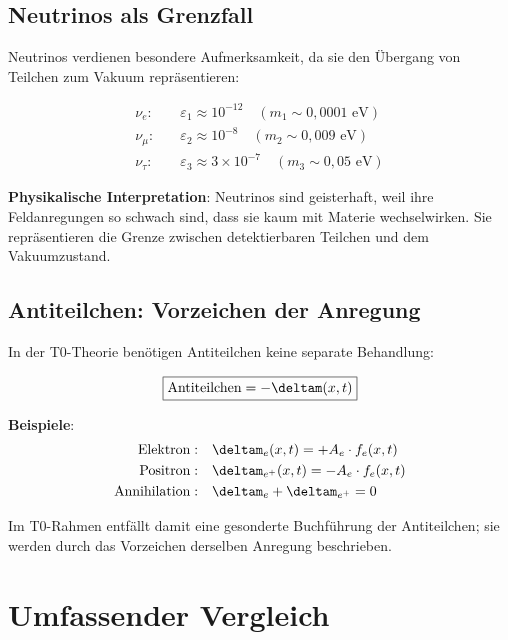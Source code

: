 	\subsection{Neutrinos als Grenzfall}
	
	Neutrinos verdienen besondere Aufmerksamkeit, da sie den Übergang von Teilchen zum Vakuum repräsentieren:
	
	\begin{equation}
		\begin{aligned}
			\nu_e: \quad &\varepsilon_1 \approx 10^{-12} \quad (m_1 \sim 0{,}0001 \text{ eV}) \\
			\nu_\mu: \quad &\varepsilon_2 \approx 10^{-8} \quad (m_2 \sim 0{,}009 \text{ eV}) \\
			\nu_\tau: \quad &\varepsilon_3 \approx 3 \times 10^{-7} \quad (m_3 \sim 0{,}05 \text{ eV})
		\end{aligned}
		\label{eq:neutrino_spectrum}
	\end{equation}
	
	\textbf{Physikalische Interpretation}: Neutrinos sind geisterhaft, weil ihre Feldanregungen so schwach sind, dass sie kaum mit Materie wechselwirken. Sie repräsentieren die Grenze zwischen detektierbaren Teilchen und dem Vakuumzustand.
	
	\subsection{Antiteilchen: Vorzeichen der Anregung}
	
	In der T0-Theorie benötigen Antiteilchen keine separate Behandlung:
	
	\begin{equation}
		\boxed{\text{Antiteilchen} = -\deltam(x,t)}
		\label{eq:antiparticle_unification}
	\end{equation}
	
	\textbf{Beispiele}:
	\begin{align}
		\text{Elektron}: \quad &\deltam_e(x,t) = +A_e \cdot f_e(x,t) \\
		\text{Positron}: \quad &\deltam_{e^+}(x,t) = -A_e \cdot f_e(x,t) \\
		\text{Annihilation}: \quad &\deltam_e + \deltam_{e^+} = 0
	\end{align}
	
	Im T0-Rahmen entfällt damit eine gesonderte Buchführung der Antiteilchen; sie werden durch das Vorzeichen derselben Anregung beschrieben.
	
	\section{Umfassender Vergleich}
	
